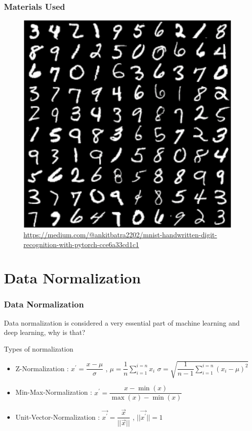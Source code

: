 \documentclass{beamer}
\begin{document}
\begin{frame}
\frametitle{Materials Used}
\begin{figure}
\centering 
\includegraphics[scale=0.35]{mnist.png}
\caption{\url {https://medium.com/@ankitbatra2202/mnist-handwritten-digit-recognition-with-pytorch-cce6a33cd1c1}}
\end{figure}
\end{frame}

\section{Data Normalization}

\begin{frame}
\frametitle{Data Normalization}
Data normalization is considered a very essential part of machine learning and deep learning, why is that?
\begin{block}{Types of normalization}
\begin{itemize}
\item \small Z-Normalization : $ x^{\prime} = \dfrac{x - \mu}{\sigma} $ , $ \mu = \dfrac{1}{n}\sum_{i=1}^{i=n}x_i $ $ \sigma = \sqrt{\dfrac{1}{n-1}\sum_{i=1}^{i=n}(x_i - \mu)^2} $
\item Min-Max-Normalization : $ x^{\prime} = \dfrac{x - \min{(x)}}{\max{(x)} - \min{(x)}} $
\item Unit-Vector-Normalization : $ \vec{x^{\prime}} = \dfrac{\vec{x}}{||\vec{x}||} $ , $ ||\vec{x^{\prime}}|| = 1 $
\end{itemize}
\end{block}
\end{frame}
\end{document}
